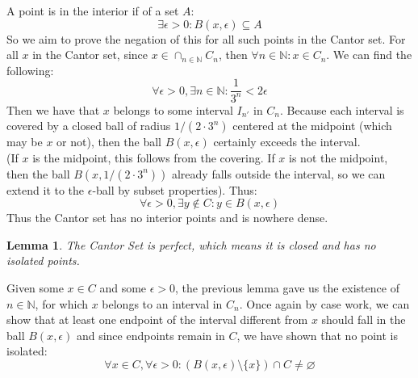 \documentclass{exam}
\newtheorem{lem}{Lemma}[section]
\begin{document}
A point is in the interior if of a set $A$:
\begin{equation*}
  \exists \epsilon > 0: B(x, \epsilon) \subseteq A
\end{equation*} 
So we aim to prove the negation of this for all such points in the Cantor set. For all $x$ in the Cantor set, since $x \in \cap_{n \in \mathbb{N}} C_n$, then $\forall n \in \mathbb{N}: x \in C_n$. We can find the following:
\begin{equation*}
  \forall \epsilon > 0, \exists n \in \mathbb{N}: \frac{1}{3^n} < 2\epsilon
\end{equation*}
Then we have that $x$ belongs to some interval $I_{n'}$ in $C_n$. Because each interval is covered by a closed ball of radius $1/(2 \cdot 3^n)$ centered at the midpoint (which may be $x$ or not), then the ball $B(x, \epsilon)$ certainly exceeds the interval.\\

(If $x$ is the midpoint, this follows from the covering. If $x$ is not the midpoint, then the ball $B(x, 1/(2 \cdot 3^n))$ already falls outside the interval, so we can extend it to the $\epsilon$-ball by subset properties). Thus:
\begin{equation*}
  \forall \epsilon > 0, \exists y \notin C: y \in B(x, \epsilon)
\end{equation*}
Thus the Cantor set has no interior points and is nowhere dense.
\begin{lem}
The Cantor Set is perfect, which means it is closed and has no isolated points.
\end{lem}
Given some $x \in C$ and some $\epsilon > 0$, the previous lemma gave us the existence of $n \in \mathbb{N}$, for which $x$ belongs to an interval in $C_n$. Once again by case work, we can show that at least one endpoint of the interval different from $x$ should fall in the ball $B(x, \epsilon)$ and since endpoints remain in $C$, we have shown that no point is isolated:
\begin{equation*}
  \forall x \in C, \forall \epsilon > 0: (B(x, \epsilon)\setminus \{x\}) \cap C \neq \varnothing
\end{equation*}

\smallskip
\end{document}
